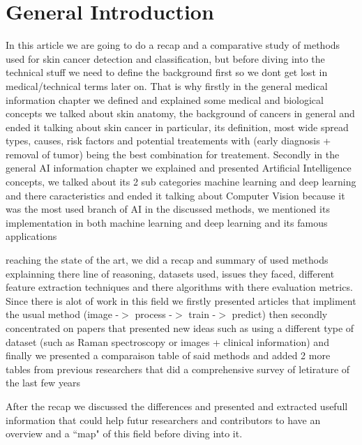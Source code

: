 \section*{General Introduction}
In this article we are going to do a recap and a comparative study of methods used for skin cancer detection and classification, but before diving into the technical stuff we need to define the background first so we dont get lost in medical/technical terms later on. That is why firstly in the general medical information chapter we defined and explained some medical and biological concepts we talked about skin anatomy, the background of cancers in general and ended it talking about skin cancer in particular, its definition, most wide spread types, causes, risk factors and potential treatements with (early diagnosis + removal of tumor) being the best combination for treatement. Secondly in the general AI information chapter we explained and presented Artificial Intelligence concepts, we talked about its 2 sub categories machine learning and deep learning and there caracteristics and ended it talking about Computer Vision because it was the most used branch of AI in the discussed methods, we mentioned its implementation in both machine learning and deep learning and its famous applications

reaching the state of the art, we did a recap and summary of used methods explainning there line of reasoning, datasets used, issues they faced, different feature extraction techniques and there algorithms with there evaluation metrics. Since there is alot of work in this field we firstly presented articles that impliment the usual method (image -$>$ process -$>$ train -$>$ predict) then secondly concentrated on papers that presented new ideas such as using a different type of dataset (such as Raman spectroscopy or images + clinical information) and finally we presented a comparaison table of said methods and added 2 more tables from previous researchers that did a comprehensive survey of letirature of the last few years

After the recap we discussed the differences and presented and extracted usefull information that could help futur researchers and contributors to have an overview and a ``map" of this field before diving into it. 